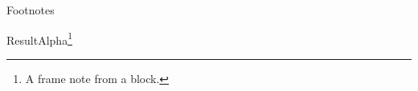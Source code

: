 \documentclass[aspectratio=169]{beamer}
\begin{document}
\begin{frame}{Footnotes}
\begin{block}{Result}Alpha\footnote[frame]{A frame note from a block.}\end{block}
\end{frame}
\end{document}
